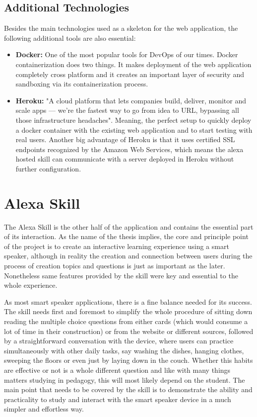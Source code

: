 \subsection{Additional Technologies}

Besides the main technologies used as a skeleton for the web application, 
the following additional tools are also essential:

\begin{itemize}
\item \textbf{Docker:} One of the most popular tools for DevOps of our times. Docker 
    containerization does two things. It makes deployment of the web application completely
    cross platform and it creates an important layer of security and sandboxing 
    via its containerization process.

\item \textbf{Heroku:} "A cloud platform that lets companies build, deliver, monitor and 
    scale apps — we're the fastest way to go from idea to URL, bypassing all those 
    infrastructure headaches". Meaning, the perfect setup to quickly deploy a docker
    container with the existing web application and to start testing with real users.
    Another big advantage of Heroku is that it uses certified SSL endpoints recognized
    by the Amazon Web Services, which means the alexa hosted skill can communicate 
    with a server deployed in Heroku without further configuration.

\end{itemize}

\section{Alexa Skill}

The Alexa Skill is the other half of the application and contains the essential
part of its interaction.
As the name of the thesis implies, the core and principle point of 
the project is to create an interactive learning experience using a smart speaker,
although in reality the creation and connection between users during the process
of creation topics and questions is just as important as the later. Nonetheless
same features provided by the skill were key and essential to the whole experience.

As most smart speaker applications, there is a fine balance needed for its success.
The skill needs first and foremost to simplify the whole procedure of sitting down 
reading the multiple choice questions from either cards (which would consume a lot 
of time in their construction) or from the website or different sources, followed
by a straightforward conversation with the device, where users can practice 
simultaneously with other daily tasks, say washing the dishes, hanging clothes,
sweeping the floors or even just by laying down in the couch. Whether this habits
are effective or not is a whole different question and like with many things matters
studying in pedagogy, this will most likely depend on the student. The main point
that needs to be covered by the skill is to demonstrate the ability and 
practicality to study and interact with the smart speaker device in a much 
simpler and effortless way.

